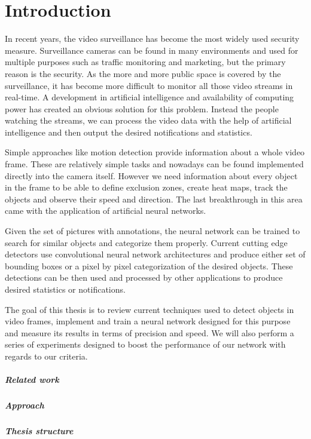 \chapter*{Introduction}

In recent years, the video surveillance has become the most widely used security measure. Surveillance cameras can be found in many environments and used for multiple purposes such as traffic monitoring and marketing, but the primary reason is the security. As the more and more public space is covered by the surveillance, it has become more difficult to monitor all those video streams in real-time. A development in artificial intelligence and availability of computing power has created an obvious solution for this problem. Instead the people watching the streams, we can process the video data with the help of artificial intelligence and then output the desired notifications and statistics. 

Simple approaches like motion detection provide information about a whole video frame. These are relatively simple tasks and nowadays can be found implemented directly into the camera itself. However we need information about every object in the frame to be able to define exclusion zones, create heat maps, track the objects and observe their speed and direction. The last breakthrough in this area came with the application of artificial neural networks.

Given the set of pictures with annotations, the neural network can be trained to search for similar objects and categorize them properly. Current cutting edge detectors use convolutional neural network architectures and produce either set of bounding boxes or a pixel by pixel categorization of the desired objects. These detections can be then used and processed by other applications to produce desired statistics or notifications. 

The goal of this thesis is to review current techniques used to detect objects in video frames, implement and train a neural network designed for this purpose and measure its results in terms of precision and speed. We will also perform a series of experiments designed to boost the performance of our network with regards to our criteria. 


\paragraph{Related work}


\paragraph{Approach}

\paragraph{Thesis structure}
